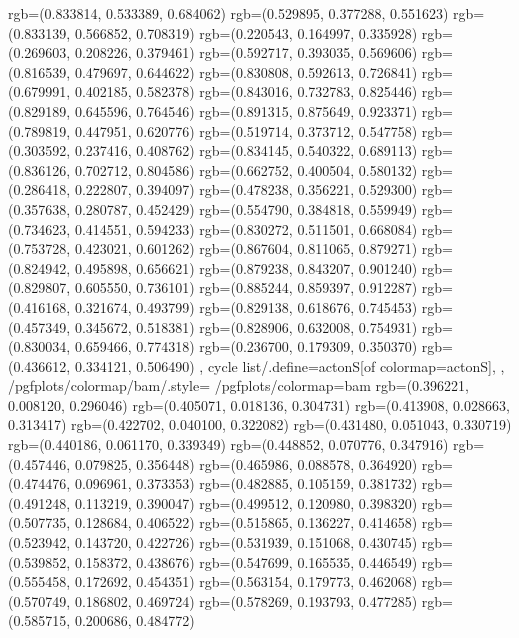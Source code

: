 {{{					rgb=(0.833814, 0.533389, 0.684062)
					rgb=(0.529895, 0.377288, 0.551623)
					rgb=(0.833139, 0.566852, 0.708319)
					rgb=(0.220543, 0.164997, 0.335928)
					rgb=(0.269603, 0.208226, 0.379461)
					rgb=(0.592717, 0.393035, 0.569606)
					rgb=(0.816539, 0.479697, 0.644622)
					rgb=(0.830808, 0.592613, 0.726841)
					rgb=(0.679991, 0.402185, 0.582378)
					rgb=(0.843016, 0.732783, 0.825446)
					rgb=(0.829189, 0.645596, 0.764546)
					rgb=(0.891315, 0.875649, 0.923371)
					rgb=(0.789819, 0.447951, 0.620776)
					rgb=(0.519714, 0.373712, 0.547758)
					rgb=(0.303592, 0.237416, 0.408762)
					rgb=(0.834145, 0.540322, 0.689113)
					rgb=(0.836126, 0.702712, 0.804586)
					rgb=(0.662752, 0.400504, 0.580132)
					rgb=(0.286418, 0.222807, 0.394097)
					rgb=(0.478238, 0.356221, 0.529300)
					rgb=(0.357638, 0.280787, 0.452429)
					rgb=(0.554790, 0.384818, 0.559949)
					rgb=(0.734623, 0.414551, 0.594233)
					rgb=(0.830272, 0.511501, 0.668084)
					rgb=(0.753728, 0.423021, 0.601262)
					rgb=(0.867604, 0.811065, 0.879271)
					rgb=(0.824942, 0.495898, 0.656621)
					rgb=(0.879238, 0.843207, 0.901240)
					rgb=(0.829807, 0.605550, 0.736101)
					rgb=(0.885244, 0.859397, 0.912287)
					rgb=(0.416168, 0.321674, 0.493799)
					rgb=(0.829138, 0.618676, 0.745453)
					rgb=(0.457349, 0.345672, 0.518381)
					rgb=(0.828906, 0.632008, 0.754931)
					rgb=(0.830034, 0.659466, 0.774318)
					rgb=(0.236700, 0.179309, 0.350370)
					rgb=(0.436612, 0.334121, 0.506490)
			},
		cycle list/.define={actonS}{[of colormap=actonS]},
		},
		/pgfplots/colormap/bam/.style={
			/pgfplots/colormap={bam}{%
					rgb=(0.396221, 0.008120, 0.296046)
					rgb=(0.405071, 0.018136, 0.304731)
					rgb=(0.413908, 0.028663, 0.313417)
					rgb=(0.422702, 0.040100, 0.322082)
					rgb=(0.431480, 0.051043, 0.330719)
					rgb=(0.440186, 0.061170, 0.339349)
					rgb=(0.448852, 0.070776, 0.347916)
					rgb=(0.457446, 0.079825, 0.356448)
					rgb=(0.465986, 0.088578, 0.364920)
					rgb=(0.474476, 0.096961, 0.373353)
					rgb=(0.482885, 0.105159, 0.381732)
					rgb=(0.491248, 0.113219, 0.390047)
					rgb=(0.499512, 0.120980, 0.398320)
					rgb=(0.507735, 0.128684, 0.406522)
					rgb=(0.515865, 0.136227, 0.414658)
					rgb=(0.523942, 0.143720, 0.422726)
					rgb=(0.531939, 0.151068, 0.430745)
					rgb=(0.539852, 0.158372, 0.438676)
					rgb=(0.547699, 0.165535, 0.446549)
					rgb=(0.555458, 0.172692, 0.454351)
					rgb=(0.563154, 0.179773, 0.462068)
					rgb=(0.570749, 0.186802, 0.469724)
					rgb=(0.578269, 0.193793, 0.477285)
					rgb=(0.585715, 0.200686, 0.484772)
}}}
